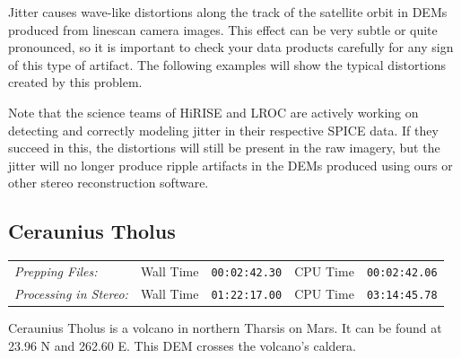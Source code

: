 Jitter causes wave-like distortions along the track of the satellite
orbit in \acp{DEM} produced from linescan camera images.  This effect can
be very subtle or quite pronounced, so it is important to check your
data products carefully for any sign of this type of artifact. The
following examples will show the typical distortions created by this
problem.

Note that the science teams of \ac{HiRISE} and \ac{LROC} are actively
working on detecting and correctly modeling jitter in their respective
SPICE data. If they succeed in this, the distortions will still
be present in the raw imagery, but the jitter will no longer produce
ripple artifacts in the DEMs produced using ours or other stereo
reconstruction software.

\subsection{Ceraunius Tholus}

\begin{tabular}{l r c r c}
\textit{Prepping Files:}       & Wall Time & \texttt{00:02:42.30} & CPU Time & \texttt{00:02:42.06} \\
\textit{Processing in Stereo:} & Wall Time & \texttt{01:22:17.00} & CPU Time & \texttt{03:14:45.78} \\
\end{tabular}

Ceraunius Tholus is a volcano in northern Tharsis on Mars. It can
be found at 23.96 N and 262.60 E. This \ac{DEM} crosses the volcano's
caldera.

